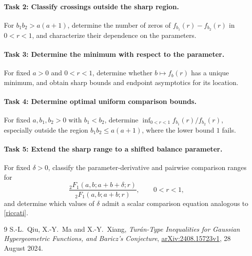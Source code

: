 \documentclass[11pt]{article}
\newcommand{\hyp}{{}_2F_1}
\begin{document}
\paragraph{Task 2: Classify crossings outside the sharp region.}
For \(b_1b_2>a(a+1)\), determine the number of zeros of
\(f_{b_1}(r)-f_{b_2}(r)\) in \(0<r<1\), and characterize their
dependence on the parameters.

\paragraph{Task 3: Determine the minimum with respect to the parameter.}
For fixed \(a>0\) and \(0<r<1\), determine whether \(b\mapsto f_b(r)\)
has a unique minimum, and obtain sharp bounds and endpoint
asymptotics for its location.

\paragraph{Task 4: Determine optimal uniform comparison bounds.}
For fixed \(a,b_1,b_2>0\) with \(b_1<b_2\), determine
\(\inf_{0<r<1}f_{b_1}(r)/f_{b_2}(r)\), especially outside
the region \(b_1b_2\le a(a+1)\), where the lower bound \(1\) fails.

\paragraph{Task 5: Extend the sharp range to a shifted balance parameter.}
For fixed \(\delta>0\), classify the parameter-derivative and
pairwise comparison ranges for
\[
 \frac{\hyp(a,b;a+b+\delta;r)}{\hyp(a,b;a+b;r)},
 \qquad 0<r<1,
\]
and determine which values of \(\delta\) admit a scalar comparison
equation analogous to \eqref{riccati}.

\begin{thebibliography}{9}
S.-L.~Qiu, X.-Y.~Ma and X.-Y.~Xiang,
\emph{Tur\'an-Type Inequalities for Gaussian Hypergeometric Functions,
and Baricz's Conjecture},
\href{https://arxiv.org/abs/2408.15723}{arXiv:2408.15723v1},
28 August 2024.
\end{thebibliography}
\end{document}
